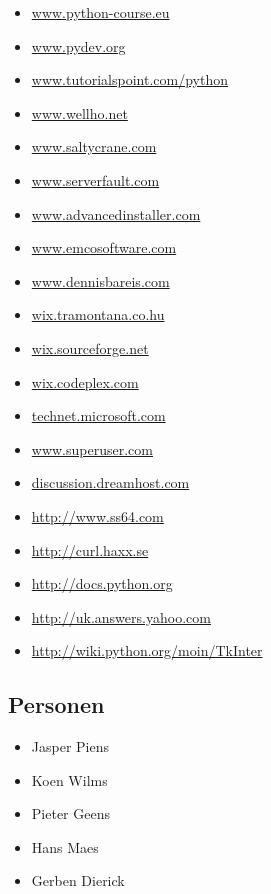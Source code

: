 \documentclass[DIV=calc]{scrartcl}
\begin{document}
\begin{itemize}
	\item \url{www.python-course.eu}
	\item \url{www.pydev.org}
	\item \url{www.tutorialspoint.com/python}
	\item \url{www.wellho.net}
	\item \url{www.saltycrane.com}
	\item \url{www.serverfault.com}
	\item \url{www.advancedinstaller.com}
	\item \url{www.emcosoftware.com}
	\item \url{www.dennisbareis.com}
	\item \url{wix.tramontana.co.hu}
	\item \url{wix.sourceforge.net}
	\item \url{wix.codeplex.com}
	\item \url{technet.microsoft.com}
	\item \url{www.superuser.com}
	\item \url{discussion.dreamhost.com}
	\item \url{http://www.ss64.com}
	\item \url{http://curl.haxx.se}
	\item \url{http://docs.python.org}
	\item \url{http://uk.answers.yahoo.com}
	\item \url{http://wiki.python.org/moin/TkInter}
\end{itemize}
\subsection{Personen}
\begin{itemize}
	\item Jasper Piens
	\item Koen Wilms
	\item Pieter Geens
	\item Hans Maes
	\item Gerben Dierick
\end{itemize}
\end{document}

